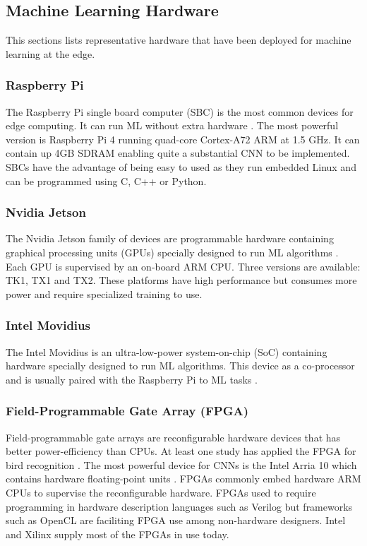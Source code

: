 \subsection{Machine Learning Hardware}

This sections lists representative hardware that have been deployed for machine learning at the edge.

\subsubsection{Raspberry Pi}

The Raspberry Pi single board computer (SBC) is the most common devices for edge computing. It can run ML without extra hardware \cite{Xu2018}. The most powerful version is Raspberry Pi 4 running quad-core Cortex-A72 ARM at 1.5 GHz. It can contain up 4GB SDRAM enabling quite a substantial CNN to be implemented. SBCs have the advantage of being easy to used as they run embedded Linux and can be programmed using C, C++ or Python.

\subsubsection{Nvidia Jetson}

The Nvidia Jetson family of devices are programmable hardware containing graphical processing units (GPUs) specially designed to run ML algorithms \cite{Otterness2017}. Each GPU is supervised by an on-board ARM CPU. Three versions are available: TK1, TX1 and TX2. These platforms have high performance but consumes more power and require specialized training to use.

\subsubsection{Intel Movidius}

The Intel Movidius is an  ultra-low-power system-on-chip (SoC) containing hardware specially designed to run ML algorithms. This device as a co-processor and is usually paired with the Raspberry Pi to ML tasks \cite{Andri2017}.

\subsubsection{Field-Programmable Gate Array (FPGA)}

Field-programmable gate arrays are reconfigurable hardware devices that has better power-efficiency than CPUs. At least one study has applied the FPGA for bird recognition \cite{Hervas2017}. The most powerful device for CNNs is the Intel Arria 10 which contains hardware floating-point units \cite{Aydonat2017}. FPGAs commonly embed hardware ARM CPUs to supervise the reconfigurable hardware. FPGAs used to require programming in hardware description languages such as Verilog but frameworks such as OpenCL are faciliting FPGA use among non-hardware designers. Intel and Xilinx supply most of the FPGAs in use today.

